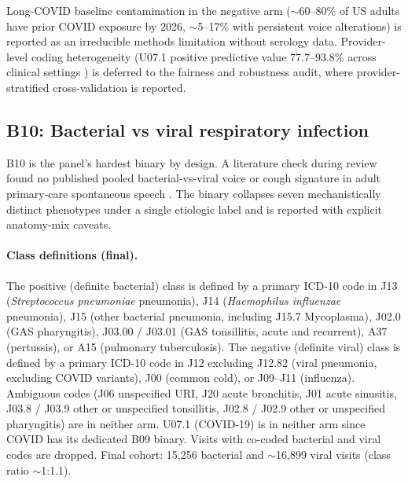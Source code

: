 \documentclass[utf8]{frontiers_suppmat} %
\begin{document}
Long-COVID baseline contamination in the negative arm ($\sim$60--80\%
of US adults have prior COVID exposure by 2026, $\sim$5--17\% with
persistent voice alterations) \citep{long-covid-voice-prevalence} is reported as an irreducible methods
limitation without serology data. Provider-level coding heterogeneity
(U07.1 positive predictive value 77.7--93.8\% across clinical
settings \citep{u071-positive-predictive-value}) is deferred to the fairness and robustness audit, where
provider-stratified cross-validation is reported.

\subsection{B10: Bacterial vs viral respiratory infection}
\label{sec:supp-b10}

B10 is the panel's hardest binary by design. A literature check
during review found no published pooled bacterial-vs-viral voice or
cough signature in adult primary-care spontaneous speech \citep{bacterial-vs-viral-voice-literature-absent}. The binary
collapses seven mechanistically distinct phenotypes under a single
etiologic label and is reported with explicit anatomy-mix caveats.

\paragraph{Class definitions (final).} The positive (definite
bacterial) class is defined by a primary ICD-10 code in J13
(\textit{Streptococcus pneumoniae} pneumonia), J14 (\textit{Haemophilus
influenzae} pneumonia), J15 (other bacterial pneumonia, including
J15.7 Mycoplasma), J02.0 (GAS pharyngitis), J03.00 / J03.01 (GAS
tonsillitis, acute and recurrent), A37 (pertussis), or A15
(pulmonary tuberculosis). The negative (definite viral) class is
defined by a primary ICD-10 code in J12 excluding J12.82
(viral pneumonia, excluding COVID variants), J00 (common cold), or
J09--J11 (influenza). Ambiguous codes (J06 unspecified URI, J20
acute bronchitis, J01 acute sinusitis, J03.8 / J03.9 other or
unspecified tonsillitis, J02.8 / J02.9 other or unspecified
pharyngitis) are in neither arm. U07.1 (COVID-19) is in neither arm
since COVID has its dedicated B09 binary. Visits with co-coded
bacterial and viral codes are dropped. Final cohort: 15{,}256
bacterial and $\sim$16{,}899 viral visits (class ratio $\sim$1:1.1).
\end{document}
